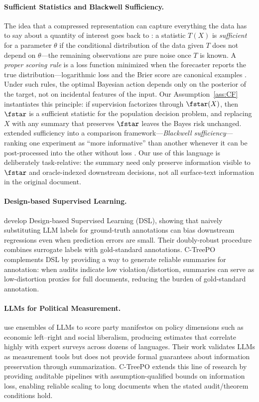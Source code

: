 \paragraph{Sufficient Statistics and Blackwell Sufficiency.}
The idea that a compressed representation can capture everything the data has to say about a quantity of interest goes back to \citet{Fisher1922}: a statistic $T(X)$ is \emph{sufficient} for a parameter $\theta$ if the conditional distribution of the data given $T$ does not depend on $\theta$---the remaining observations are pure noise once $T$ is known. A \emph{proper scoring rule} is a loss function minimized when the forecaster reports the true distribution---logarithmic loss and the Brier score are canonical examples \citep{GneitingRaftery2007,Dawid2007}. Under such rules, the optimal Bayesian action depends only on the posterior of the target, not on incidental features of the input. Our Assumption~\ref{ass:CF} instantiates this principle: if supervision factorizes through $\fstar(X)$, then $\fstar$ is a sufficient statistic for the population decision problem, and replacing $X$ with any summary that preserves $\fstar$ leaves the Bayes risk unchanged. \citet{Blackwell1953} extended sufficiency into a comparison framework---\emph{Blackwell sufficiency}---ranking one experiment as ``more informative'' than another whenever it can be post-processed into the other without loss \citep{Torgersen1991}. Our use of this language is deliberately task-relative: the summary need only preserve information visible to $\fstar$ and oracle-indexed downstream decisions, not all surface-text information in the original document.

\paragraph{Design-based Supervised Learning.}
\citet{EgamiEtAl2024} develop Design-based Supervised Learning (DSL), showing that naively substituting LLM labels for ground-truth annotations can bias downstream regressions even when prediction errors are small. Their doubly-robust procedure combines surrogate labels with gold-standard annotations. C-TreePO complements DSL by providing a way to generate reliable summaries for annotation: when audits indicate low violation/distortion, summaries can serve as low-distortion proxies for full documents, reducing the burden of gold-standard annotation.

\paragraph{LLMs for Political Measurement.}
\citet{BenoitEtAl2025} use ensembles of LLMs to score party manifestos on policy dimensions such as economic left--right and social liberalism, producing estimates that correlate highly with expert surveys across dozens of languages. Their work validates LLMs as measurement tools but does not provide formal guarantees about information preservation through summarization. C-TreePO extends this line of research by providing auditable pipelines with assumption-qualified bounds on information loss, enabling reliable scaling to long documents when the stated audit/theorem conditions hold.

